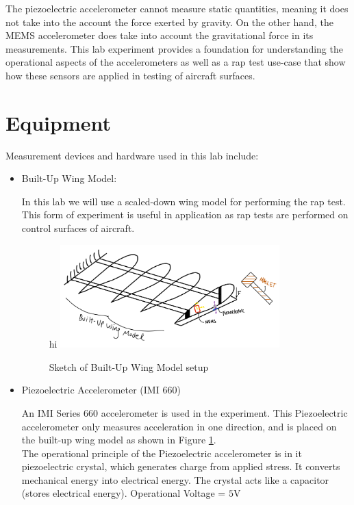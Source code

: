 \documentclass{article}
\begin{document}
The piezoelectric accelerometer cannot measure static quantities, meaning it does not take into the account the force exerted by gravity. On the other hand, the MEMS accelerometer does take into account the gravitational force in its measurements. This lab experiment provides a foundation for understanding the operational aspects of the accelerometers as well as a rap test use-case that show how these sensors are applied in testing of aircraft surfaces.

\section{Equipment}
Measurement devices and hardware used in this lab include:
\begin{itemize}

\item Built-Up Wing Model: 
\vspace{1mm}

In this lab we will use a scaled-down wing model for performing the rap test. This form of experiment is useful in application as rap tests are performed on control surfaces of aircraft.

\begin{figure}[H]
    \centering
    \caption{Sketch of Built-Up Wing Model setup}hi
    \includegraphics[width = 0.8\textwidth]{lab6images/wingmodellab6.png}
    \label{fig:wingmodel}
\end{figure}
\vspace{2.5mm}

\item Piezoelectric Accelerometer (IMI 660)
\vspace{1mm}

An IMI Series 660 accelerometer is used in the experiment. This Piezoelectric accelerometer only measures acceleration in one direction, and is placed on the built-up wing model as shown in Figure \ref{fig:wingmodel}.\\[1mm]
The operational principle of the Piezoelectric accelerometer is in it piezoelectric crystal, which generates charge from applied stress. It converts mechanical energy into electrical energy. The crystal acts like a capacitor (stores electrical energy). Operational Voltage = $5\text{V}$
\vspace{2.5mm}


\end{itemize}
\end{document}
